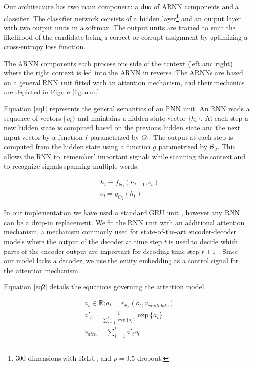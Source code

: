 \documentclass[11pt]{article}
\begin{document}
Our architecture has two main component: a duo of ARNN components and a classifier. The classifier network consists of a hidden layer\footnote{300 dimensions with ReLU, and $p=0.5$ dropout.} and an output layer with two output units in a softmax. The output units are trained to emit the likelihood of the candidate being a correct or corrupt assignment by optimizing a cross-entropy loss function. 

The ARNN components each process one side of the context (left and right) where the right context is fed into the ARNN in reverse. The ARNNs are based on a general RNN unit fitted with an attention mechanism, and their mechanics are depicted in Figure \ref{fig:arnn}. 

Equation \ref{eq1} represents the general semantics of an RNN unit. An RNN reads a sequence of vectors $\{v_t\}$ and maintains a hidden state vector $\{h_t\}$. At each step a new hidden state is computed based on the previous hidden state and the next input vector by a function $f$ parametrized by $\Theta_1$. The output at each step is computed from the hidden state using a function $g$ parametrized by $\Theta_2$. This allows the RNN to 'remember' important signals while scanning the context and to recognize signals spanning multiple words.

\begin{equation}
\label{eq1}
\begin{aligned}
& h_t=f_{\Theta_1}(h_{t-1}, v_t) \\
& o_t=g_{\Theta_2}(h_t)
\end{aligned}
\end{equation}

In our implementation we have used a standard GRU unit \cite{cho2014learning}, however any RNN can be a drop-in replacement. We fit the RNN unit with an additional attention mechanism, a mechanism commonly used for state-of-the-art encoder-decoder models where the output of the decoder at time step $t$ is used to decide which parts of the encoder output are important for decoding time step $t+1$ \cite{bahdanau2014neural, xu2015show}. Since our model lacks a decoder, we use the entity embedding as a control signal for the attention mechanism.

Equation \ref{eq2} details the equations governing the attention model.

\begin{equation}
\label{eq2}
\begin{aligned}
& a_t \in \mathbb{R}; a_t=r_{\Theta_3}(o_t, v_{candidate}) \\
& a'_t  = \frac{1}{\sum_{i=1}^{t} \exp\{a_i\}} \exp \{a_t\} \\
& o_{attn}=\sum_{i=1}^{t} a'_t o_t
\end{aligned}
\end{equation}
\end{document}
